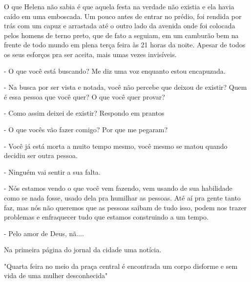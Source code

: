 O que Helena não sabia é que aquela festa na verdade não existia e ela havia caído em uma emboscada. Um pouco antes de entrar no prédio, foi rendida por trás com um capuz e arrastada até o outro lado da avenida onde foi colocada pelos homens de terno preto, que de fato a seguiam, em um camburão bem na frente de todo mundo em plena terça feira às 21 horas da noite. Apesar de todos os seus esforços pra ser aceita, mais umas vezes invisíveis.

- O que você está buscando? Me diz uma voz enquanto estou encapuzada. 

- Na busca por ser vista e notada, você não percebe que deixou de existir? Quem é essa pessoa que você quer? O que você quer provar?

- Como assim deixei de existir? Respondo em prantos

- O que vocês vão fazer comigo? Por que me pegaram?

- Você já está morta a muito tempo mesmo, você mesmo se matou quando decidiu ser outra pessoa.

- Ninguém vai sentir a sua falta.

- Nós estamos vendo o que você vem fazendo, vem usando de sua habilidade como se nada fosse, usado dela pra humilhar as pessoas. Até aí pra gente tanto faz, mas nós não queremos que as pessoas saibam de tudo isso, podem nos trazer problemas e enfraquecer tudo que estamos construindo a um tempo.

- Pelo amor de Deus, nã....

Na primeira página do jornal da cidade uma notícia.

"Quarta feira no meio da praça central é encontrada um corpo disforme e sem vida de uma mulher desconhecida"




